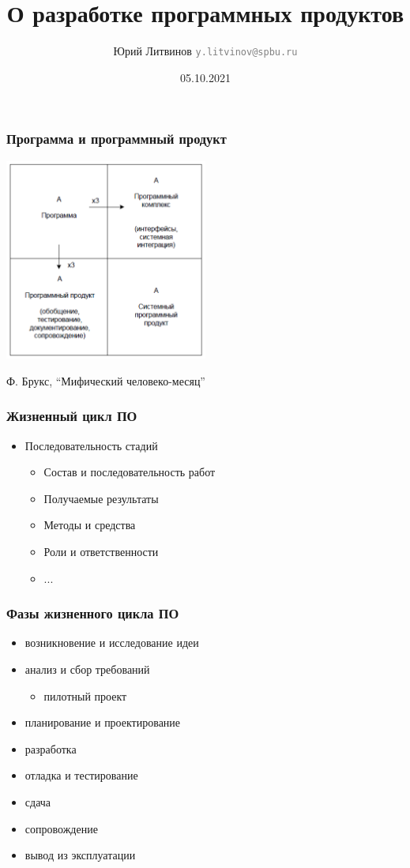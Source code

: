 \documentclass[xetex,mathserif,serif]{beamer}
\title{О разработке программных продуктов}
\author[Юрий Литвинов]{Юрий Литвинов \newline \textcolor{gray}{\small\texttt{y.litvinov@spbu.ru}}}
\date{05.10.2021}
\begin{document}
	
	\frame{\titlepage}
	
	\begin{frame}
		\frametitle{Программа и программный продукт}
		\begin{center}
			\includegraphics[width=0.5\textwidth]{mythical-man-month.png}
		\end{center}
		\begin{center}
			Ф. Брукс, ``Мифический человеко-месяц''
		\end{center}
	\end{frame}

	\begin{frame}
		\frametitle{Жизненный цикл ПО}
		\begin{itemize}
			\item Последовательность стадий
			\begin{itemize}
				\item Состав и последовательность работ
				\item Получаемые результаты
				\item Методы и средства
				\item Роли и ответственности
				\item ...
			\end{itemize}
		\end{itemize}
	\end{frame}

	\begin{frame}
		\frametitle{Фазы жизненного цикла ПО}
		\begin{itemize}
			\item возникновение и исследование идеи
			\item анализ и сбор требований
			\begin{itemize}
				\item пилотный проект
			\end{itemize}
			\item планирование и проектирование
			\item разработка
			\item отладка и тестирование
			\item сдача
			\item сопровождение
			\item вывод из эксплуатации
		\end{itemize}
	\end{frame}
\end{document}
